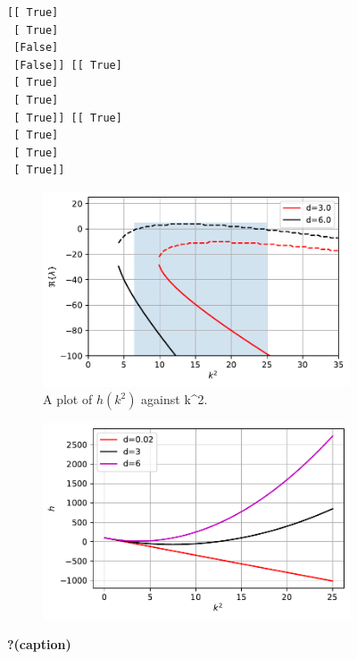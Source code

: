 \documentclass[
  letterpaper,
  DIV=11,
  numbers=noendperiod]{scrreprt}
\theoremstyle{definition}
\theoremstyle{plain}
\theoremstyle{plain}
\theoremstyle{remark}
\begin{document}
\begin{figure}

{\centering 

\begin{verbatim}
[[ True]
 [ True]
 [False]
 [False]] [[ True]
 [ True]
 [ True]
 [ True]] [[ True]
 [ True]
 [ True]
 [ True]]
\end{verbatim}

\begin{figure}

{\centering \includegraphics{DiffusionDrivenInstability_files/figure-pdf/fig-dispersion-output-2.pdf}

}

\caption{A plot of \(h(k^2)\) against k\^{}2.}

\end{figure}

\begin{figure}

{\centering \includegraphics{DiffusionDrivenInstability_files/figure-pdf/fig-dispersion-output-3.pdf}

}

\end{figure}

}

\caption{\label{fig-dispersion}\textbf{?(caption)}}

\end{figure}
\end{document}
